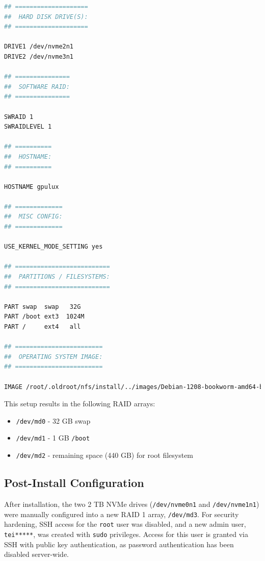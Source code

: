 \begin{lstlisting}[language=bash,caption={Hetzner's installimage script for automated Debian installation on gpulux.}]
## ====================
##  HARD DISK DRIVE(S):
## ====================

DRIVE1 /dev/nvme2n1
DRIVE2 /dev/nvme3n1

## ===============
##  SOFTWARE RAID:
## ===============

SWRAID 1
SWRAIDLEVEL 1

## ==========
##  HOSTNAME:
## ==========

HOSTNAME gpulux

## =============
##  MISC CONFIG:
## =============

USE_KERNEL_MODE_SETTING yes

## ==========================
##  PARTITIONS / FILESYSTEMS:
## ==========================

PART swap  swap   32G
PART /boot ext3  1024M
PART /     ext4   all

## ========================
##  OPERATING SYSTEM IMAGE:
## ========================

IMAGE /root/.oldroot/nfs/install/../images/Debian-1208-bookworm-amd64-base.tar.gz
\end{lstlisting}

This setup results in the following RAID arrays:

\begin{itemize}
  \item \texttt{/dev/md0} - 32 GB swap
  \item \texttt{/dev/md1} - 1 GB \texttt{/boot}
  \item \texttt{/dev/md2} - remaining space (440 GB) for root filesystem
\end{itemize}

\subsection*{Post-Install Configuration}

After installation, the two 2 TB NVMe drives (\texttt{/dev/nvme0n1} and \texttt{/dev/nvme1n1}) were manually configured into a new RAID 1 array, \texttt{/dev/md3}. For security hardening, SSH access for the \texttt{root} user was disabled, and a new admin user, \texttt{tei*****}, was created with \texttt{sudo} privileges. Access for this user is granted via SSH with public key authentication, as password authentication has been disabled server-wide.

